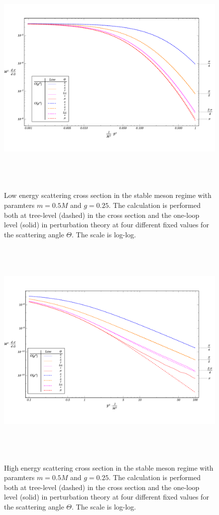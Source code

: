 \documentclass{article}
\begin{document}
\begin{figure}
\begin{center}
\vspace*{-2cm}
\includegraphics[width=15cm, height=11cm]{StableMeson-LowEnergy}
\caption{Low energy scattering cross section in the stable meson regime with paramters $m = 0.5 M$ and $g = 0.25$. The calculation is performed both at tree-level (dashed) in the cross section and the one-loop level (solid) in perturbation theory at four different fixed values for the scattering angle $\Theta$. The scale is log-log.} 
\label{StabLowEnergy}
\includegraphics[width=15cm, height=11cm]{StableMeson-HighEnergy}
\caption{High energy scattering cross section in the stable meson regime with paramters $m = 0.5 M$ and $g = 0.25$. The calculation is performed both at tree-level (dashed) in the cross section and the one-loop level (solid) in perturbation theory at four different fixed values for the scattering angle $\Theta$. The scale is log-log.} 
\label{StabHighEnergy}
\end{center}
\end{figure} 
\end{document}
